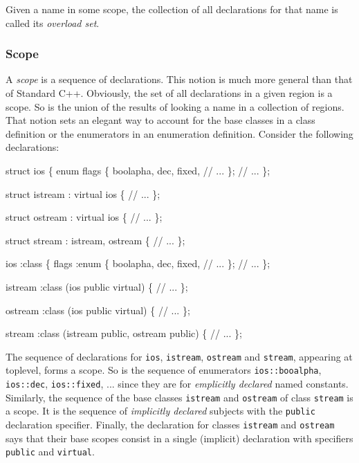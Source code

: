 \documentclass[letter,11pt]{article}
\begin{document}
Given a name in some scope, the collection of all declarations for that name
is called its \emph{overload set}.


\subsubsection{Scope}
\label{sec:intro:general-notion:scope}
A \emph{scope} is a sequence of declarations. This notion is much more
general than that of Standard C++.  Obviously, the set of all declarations in
a given region is a scope.  So is the union of the results of looking a name
in a collection of regions.  That notion sets an elegant way to
account for the base classes in a class definition or the enumerators in
an enumeration definition.  Consider the following declarations:
\begin{center}
  \begin{minipage}[t]{6cm}
    \begin{Program}
struct ios \{
  enum flags \{
    boolapha, dec, fixed,
    // ...
  \};
  // ...
\};

struct istream : virtual ios \{
  // ...
\};

struct ostream : virtual ios \{
  // ...
\};

struct stream : istream,
                ostream \{
  // ...
\};
    \end{Program}
  \end{minipage}\hfil \vrule \hfil
  \begin{minipage}[t]{6cm}
    \begin{Program}
ios :class \{
  flags :enum \{
    boolapha, dec, fixed,
    // ...
  \};
  // ...
\};

istream :class (ios public virtual) \{
  // ...
\};

ostream :class (ios public virtual) \{
  // ...
\};

stream :class (istream public,
               ostream public) \{
  // ...
\};
    \end{Program}
  \end{minipage}
\end{center}

The sequence of declarations for \texttt{ios}, \texttt{istream},
\texttt{ostream} and \texttt{stream}, appearing at toplevel, forms a scope.
So is the sequence of enumerators \texttt{ios::booalpha}, \texttt{ios::dec},
\texttt{ios::fixed}, ...  since they are for \emph{emplicitly declared}
named constants.  Similarly, the sequence of the base classes
\texttt{istream} and \texttt{ostream} of class \texttt{stream} is  a scope.
It is the sequence of \emph{implicitly declared} subjects with the
\texttt{public} declaration specifier.  Finally, the declaration for classes
\texttt{istream} and \texttt{ostream} says that their base scopes consist in
a single (implicit) declaration with specifiers \texttt{public} and
\texttt{virtual}.
\end{document}
